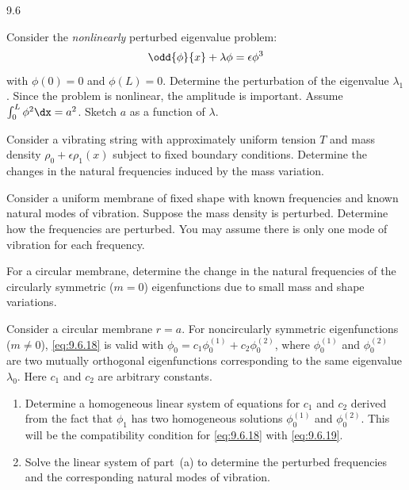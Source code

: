 \begin{exercises}{9.6}
\item Consider the \emph{nonlinearly} perturbed eigenvalue problem:
\[
\odd{\phi}{x} + \lambda\phi = \epsilon\phi^3
\]
with $\phi(0)=0$ and $\phi(L)=0$.  Determine the perturbation of the eigenvalue $\lambda_1$.  Since the problem is nonlinear, the amplitude is important.  Assume $\int_0^L\phi^2\dx = a^2$.  Sketch $a$ as a function of $\lambda$.

\item Consider a vibrating string with approximately uniform tension $T$ and mass density $\rho_0 + \epsilon\rho_1(x)$ subject to fixed boundary conditions.  Determine the changes in the natural frequencies induced by the mass variation.

\item Consider a uniform membrane of fixed shape with known frequencies and known natural modes of vibration.  Suppose the mass density is perturbed.  Determine how the frequencies are perturbed.  You may assume there is only one mode of vibration for each frequency.

\item For a circular membrane, determine the change in the natural frequencies of the circularly symmetric ($m = 0$) eigenfunctions due to small mass and shape variations.

\item Consider a circular membrane $r = a$.  For noncircularly symmetric eigenfunctions ($m \neq 0$), \eqref{eq:9.6.18} is valid with $\phi_0 = c_1\phi_0^{(1)} + c_2\phi_0^{(2)}$, where $\phi_0^{(1)}$ and $\phi_0^{(2)}$ are two mutually orthogonal eigenfunctions corresponding to the same eigenvalue $\lambda_0$.  Here $c_1$ and $c_2$ are arbitrary constants.
\begin{enumerate}
\item[(a)] Determine a homogeneous linear system of equations for $c_1$ and $c_2$ derived from the fact that $\phi_1$ has two homogeneous solutions $\phi_0^{(1)}$ and $\phi_0^{(2)}$.  This will be the compatibility condition for \eqref{eq:9.6.18} with \eqref{eq:9.6.19}.
\item[(b)] Solve the linear system of part~(a) to determine the perturbed frequencies and the corresponding natural modes of vibration.
\end{enumerate}

\end{exercises}
